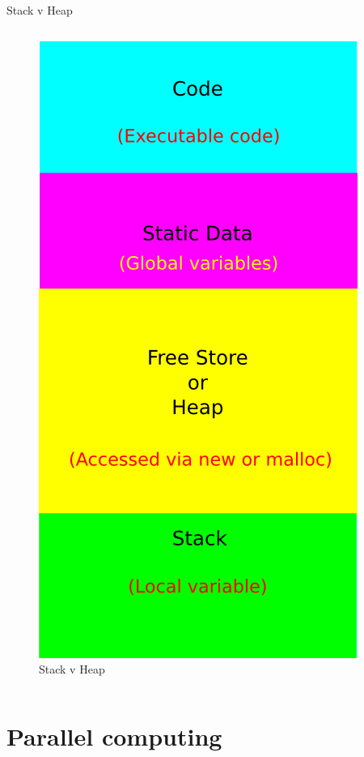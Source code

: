 \documentclass[10pt,times]{beamer}
\begin{document}
\begin{frame}{Stack v Heap}
\begin{columns}
\begin{figure}
\includegraphics[width=.8\linewidth]{figs/stack_heap}
\caption*{Stack v Heap}
\end{figure}

\end{columns}
\end{frame}

\section{Parallel computing}
\end{document}
